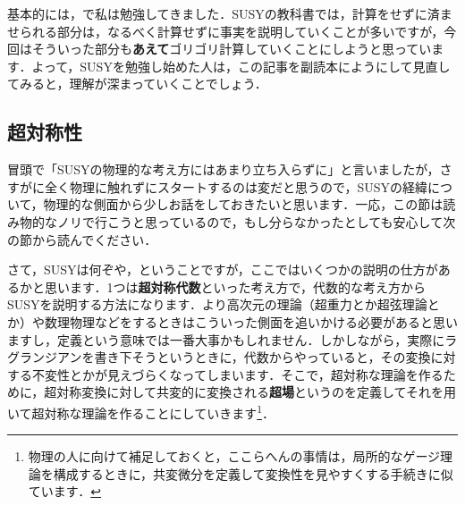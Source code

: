 \documentclass[a4paper,uplatex,dvipdfmx]{jsarticle}
\theoremstyle{definition}
\begin{document}
基本的には，\cite{Wess_SupersymmetrySupergravity_1992}で私は勉強してきました．SUSYの教科書では，計算をせずに済ませられる部分は，なるべく計算せずに事実を説明していくことが多いですが，今回はそういった部分も\textbf{あえて}ゴリゴリ計算していくことにしようと思っています．よって，SUSYを勉強し始めた人は，この記事を副読本にようにして見直してみると，理解が深まっていくことでしょう．

\subsection{超対称性}

冒頭で「SUSYの物理的な考え方にはあまり立ち入らずに」と言いましたが，さすがに全く物理に触れずにスタートするのは変だと思うので，SUSYの経緯について，物理的な側面から少しお話をしておきたいと思います．一応，この節は読み物的なノリで行こうと思っているので，もし分らなかったとしても安心して次の節から読んでください．

さて，SUSYは何ぞや，ということですが，ここではいくつかの説明の仕方があるかと思います．1つは\textbf{超対称代数}といった考え方で，代数的な考え方からSUSYを説明する方法になります．より高次元の理論（超重力とか超弦理論とか）や数理物理などをするときはこういった側面を追いかける必要があると思いますし，定義という意味では一番大事かもしれません．しかしながら，実際にラグランジアンを書き下そうというときに，代数からやっていると，その変換に対する不変性とかが見えづらくなってしまいます．そこで，超対称な理論を作るために，超対称変換に対して共変的に変換される\textbf{超場}というのを定義してそれを用いて超対称な理論を作ることにしていきます\footnote{
  物理の人に向けて補足しておくと，ここらへんの事情は，局所的なゲージ理論を構成するときに，共変微分を定義して変換性を見やすくする手続きに似ています．
}．
\end{document}
